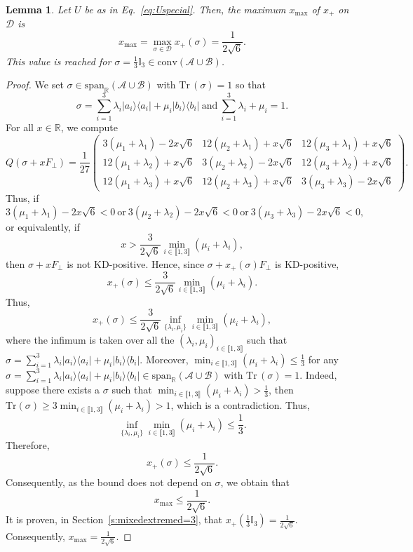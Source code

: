 \documentclass[a4paper, notitlepage, 11pt]{article}
\numberwithin{equation}{section}
\newcommand{\bra}[1]{\langle #1|}
\newcommand{\cket}[1]{|#1\rangle}
\newcommand{\mcl}[1]{\mathcal{#1}}
\newcommand{\Acal}{{\mathcal A}}
\newcommand{\Bcal}{{\mathcal B}}
\newcommand{\spanRAB}{{\mathrm{span}_{\R}(\Acal\cup\Bcal)}}
\newcommand{\R}{\mathbb{R}}
\newcommand{\bbone}{\mathbb{I}}
\newcommand{\Tr}{\mathrm{Tr}\,}
\newcommand{\conv}[1]{\mathrm{conv}\left(#1\right)}
\newcommand{\IntEnt}[2]{\llbracket #1 , #2 \rrbracket}
\newcommand{\convAB}{\conv{\Acal \cup \Bcal}}
\newtheorem{Lemma}[Theorem]{Lemma}
\begin{document}
\begin{Lemma}\label{Lem:EKDCmax}
Let $U$ be as in Eq.~\eqref{eq:Uspecial}. Then, the maximum $x_{\max}$ of $x_+$ on $\mcl{D}$ is 
\[
x_{\max}=\max_{\sigma\in\mathcal D} x_+(\sigma) = \frac{1}{2\sqrt{6}}.
\]
This value is reached for $\sigma=\frac{1}{3}\bbone_{3}\in\convAB$.
\end{Lemma}
\begin{proof}
We set $\sigma\in \spanRAB$ with $\Tr(\sigma)=1$ so that
\[
\sigma = \sum_{i=1}^{3} \lambda_{i}\cket{a_i}\bra{a_i} + \mu_{i}\cket{b_i}\bra{b_i} \ \mathrm{and} \ \sum_{i=1}^{3}  \lambda_i + \mu_i = 1. 
\]
For all $x\in\R$, we  compute
\[
Q(\sigma+x F_{\perp}) = \frac{1}{27}
\begin{pmatrix}
3(\mu_1+\lambda_1)-2x\sqrt{6} & 12(\mu_2+\lambda_1)+x\sqrt{6} & 12(\mu_3+\lambda_1)+x\sqrt{6} \\
12(\mu_1+\lambda_2)+x\sqrt{6} & 3(\mu_2+\lambda_2)-2x\sqrt{6}& 12(\mu_3+\lambda_2)+x\sqrt{6}\\
12(\mu_1+\lambda_3)+x\sqrt{6} & 12(\mu_2+\lambda_3)+x\sqrt{6} & 3(\mu_3+\lambda_3)-2x\sqrt{6}
\end{pmatrix}.
\]
Thus, if 
\[
3(\mu_1+\lambda_1)-2x\sqrt{6} < 0 \ \mathrm{or} \ 3(\mu_2+\lambda_2)-2x\sqrt{6} < 0 \ \mathrm{or} \ 3(\mu_3+\lambda_3)-2x\sqrt{6} < 0, 
\]
or equivalently, if 
\[
x > \frac{3}{2\sqrt{6}}\min_{i\in\IntEnt{1}{3}} (\mu_i+\lambda_i),
\]
then $\sigma+x F_{\perp}$ is not KD-positive. Hence, since $\sigma+x_{+}(\sigma) F_{\perp}$ is KD-positive,  
\begin{equation}\label{eq:xpsigma}
x_{+}(\sigma) \leqslant \frac{3}{2\sqrt{6}}\min_{i\in\IntEnt{1}{3}} (\mu_i+\lambda_i).
\end{equation}
Thus, 
\[
x_{+}(\sigma) \leqslant \frac{3}{2\sqrt{6}}\inf_{\{\lambda_i,\mu_i\}}\min_{i\in\IntEnt{1}{3}} (\mu_i+\lambda_i),
\]
where the infimum is taken over all the $(\lambda_i,\mu_i)_{i\in\IntEnt{1}{3}}$ such that 
$\sigma = \sum_{i=1}^{3} \lambda_i\cket{a_i}\bra{a_i} + \mu_i\cket{b_i}\bra{b_i}.$
Moreover, $\min_{i\in\IntEnt{1}{3}} (\mu_i+\lambda_i) \leqslant \frac{1}{3}$ for any $\sigma = \sum_{i=1}^{3} \lambda_i\cket{a_i}\bra{a_i} + \mu_i\cket{b_i}\bra{b_i} \in \spanRAB$ with $\Tr(\sigma)=1$. Indeed, suppose there exists a $\sigma$ such that $\min_{i\in\IntEnt{1}{3}} (\mu_i+\lambda_i) > \frac{1}{3}$, then $\mathrm{Tr}(\sigma) \geqslant 3 \min_{i\in\IntEnt{1}{3}} (\mu_i+\lambda_i) > 1$, which is a contradiction. Thus,
\[
\inf_{\{\lambda_i,\mu_i\}}\min_{i\in\IntEnt{1}{3}} (\mu_i+\lambda_i)
\leqslant \frac{1}{3}.
\]
Therefore,
\[
x_{+}(\sigma) \leqslant \frac{1}{2\sqrt{6}}.
\]
Consequently, as the bound does not depend on $\sigma$, we obtain that
\[
x_{\max} \leqslant\frac{1}{2\sqrt{6}}.
\]
It is proven, in Section~\ref{s:mixedextremed=3}, that $x_{+}(\frac{1}{3}\bbone_3)= \frac{1}{2\sqrt{6}}$. Consequently, $x_{\max}= \frac{1}{2\sqrt{6}}$.

\end{proof}
\end{document}
